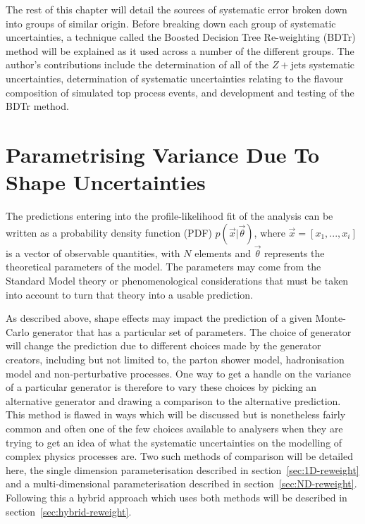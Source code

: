 The rest of this chapter will detail the sources of systematic error broken down
into groups of similar origin. Before breaking down each group of systematic
uncertainties, a technique called the Boosted Decision Tree Re-weighting (BDTr)
method will be explained as it used across a number of the different groups. The
author's contributions include the determination of all of the $Z+$jets
systematic uncertainties, determination of systematic uncertainties relating to
the flavour composition of simulated top process events, and development and
testing of the BDTr method.

\section{Parametrising Variance Due To Shape Uncertainties}
\label{sec:re-weighting}

The predictions entering into the profile-likelihood fit of the analysis can be
written as a probability density function (PDF) $p(\vec{x}|\vec{\theta})$,
where $\vec{x} = [x_{1},..., x_{i}]$ is a vector of observable quantities, with
$N$ elements and $\vec{\theta}$ represents the theoretical parameters of the
model. The parameters may come from the Standard Model theory or
phenomenological considerations that must be taken into account to turn that
theory into a usable prediction.

As described above, shape effects may impact the prediction of a given
Monte-Carlo generator that has a particular set of parameters. The choice of
generator will change the prediction due to different choices made by the
generator creators, including but not limited to, the parton shower model,
hadronisation model and non-perturbative processes. One way to get a handle on
the variance of a particular generator is therefore to vary these
choices by picking an alternative generator and drawing a comparison to the
alternative prediction. This method is flawed in ways which will be discussed
but is nonetheless fairly common and often one of the few choices available to
analysers when they are trying to get an idea of what the systematic
uncertainties on the modelling of complex physics processes are. Two such
methods of comparison will be detailed here, the single dimension
parameterisation described in section~\ref{sec:1D-reweight} and a
multi-dimensional parameterisation described in section~\ref{sec:ND-reweight}.
Following this a hybrid approach which uses both methods will be described in
section~\ref{sec:hybrid-reweight}.

